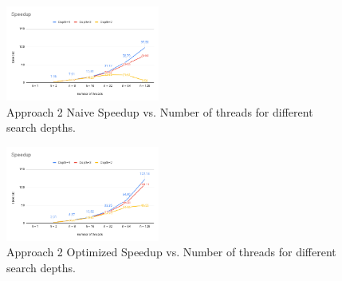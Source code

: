 \begin{figure}[h]
	\centering
	\includegraphics[width=0.45\textwidth]{Speedup_naive.png}
	\vspace{-1em}
	\caption{Approach 2 Naive Speedup vs. Number of threads for different search depths.}
	\label{fig:speedup_naive}
\end{figure}

\begin{figure}[h]
	\centering
	\includegraphics[width=0.45\textwidth]{Speedup_optimized.png}
	\vspace{-1em}
	\caption{Approach 2 Optimized Speedup vs. Number of threads for different search depths.}
	\label{fig:speedup_optimized}
\end{figure}

